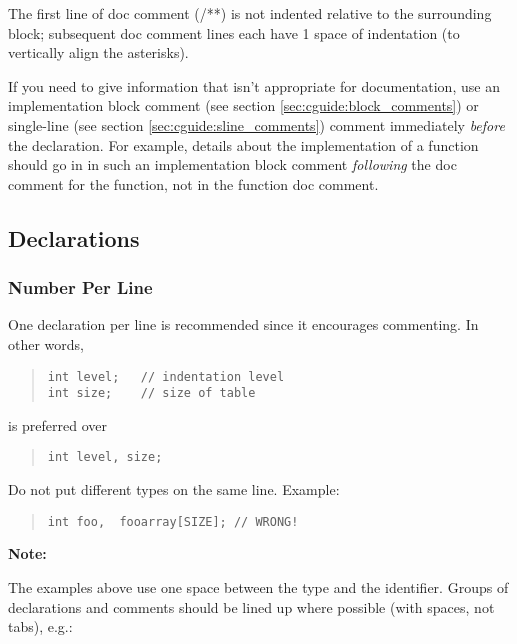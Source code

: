 \documentclass{article}
\begin{document}
The first line of doc comment (/**) is not indented relative to the
surrounding block; subsequent doc comment lines each have 1
space of indentation (to vertically align the asterisks).

If you need to give information that isn't appropriate for
documentation, use an implementation block comment (see section
\ref{sec:cguide:block_comments}) or single-line (see section
\ref{sec:cguide:sline_comments}) comment immediately
\emph{before} the declaration. For example, details about the
implementation of a function should go in in such an implementation
block comment \emph{following} the doc comment for the function, not
in the function doc comment.


\subsection{Declarations}

\subsubsection{Number Per Line}

One declaration per line is recommended since it encourages commenting. In other words, 

\begin{quote}
\begin{verbatim}
int level;   // indentation level
int size;    // size of table 
\end{verbatim}
\end{quote}

is preferred over 

\begin{quote}
\begin{verbatim}
int level, size;
\end{verbatim}
\end{quote}

Do not put different types on the same line. Example: 

\begin{quote}
\begin{verbatim}
int foo,  fooarray[SIZE]; // WRONG!
\end{verbatim}
\end{quote}
 
\textbf{Note:}

The examples above use one space between the type and the identifier.
Groups of declarations and comments should be lined up where possible
(with spaces, not tabs), e.g.:
\end{document}
